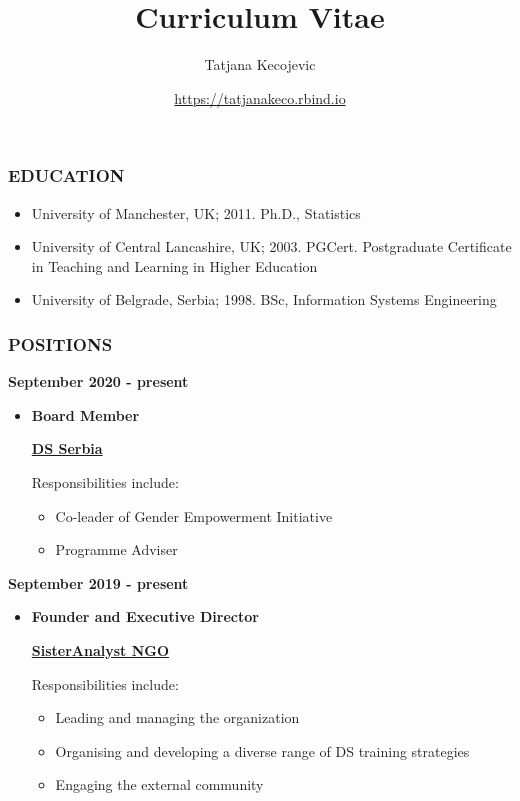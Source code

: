 \documentclass[
]{article}
\title{Curriculum Vitae}
\author{Tatjana Kecojevic}
\date{\url{https://tatjanakeco.rbind.io}}
\providecommand{\tightlist}{%
  \setlength{\itemsep}{0pt}\setlength{\parskip}{0pt}}
\begin{document}
\maketitle

\hypertarget{education}{%
\subsubsection{EDUCATION}\label{education}}

\begin{itemize}
\tightlist
\item
  University of Manchester, UK; 2011. Ph.D., Statistics
\item
  University of Central Lancashire, UK; 2003. PGCert. Postgraduate
  Certificate in Teaching and Learning in Higher Education
\item
  University of Belgrade, Serbia; 1998. BSc, Information Systems
  Engineering
\end{itemize}

\hypertarget{positions}{%
\subsubsection{POSITIONS}\label{positions}}

\textbf{September 2020 - present}

\begin{itemize}
\item
  \textbf{Board Member}

  \href{http://www.datascience.rs/}{\textbf{DS Serbia}}

  Responsibilities include:

  \begin{itemize}
  \tightlist
  \item
    Co-leader of Gender Empowerment Initiative
  \item
    Programme Adviser
  \end{itemize}
\end{itemize}

\textbf{September 2019 - present}

\begin{itemize}
\item
  \textbf{Founder and Executive Director}

  \href{https://sisteranalyst.org}{\textbf{SisterAnalyst NGO}}

  Responsibilities include:

  \begin{itemize}
  \tightlist
  \item
    Leading and managing the organization
  \item
    Organising and developing a diverse range of DS training strategies
  \item
    Engaging the external community
  \end{itemize}
\end{itemize}
\end{document}
